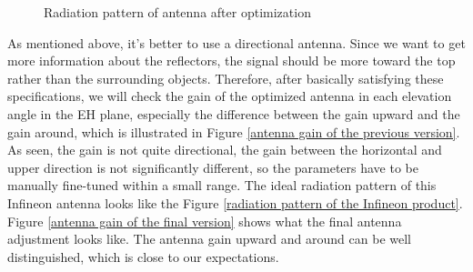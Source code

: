 \documentclass[12pt,DIV14,BCOR12mm,a4paper,footinclude=false,headinclude,parskip=half-,twoside,openright,cleardoublepage=empty,toc=index,bibliography=totoc,listof=totoc]{scrreprt}
\numberwithin{equation}{chapter}
\begin{document}
\begin{figure}[!htb]
\begin{subfigure}{0.45\textwidth}
    \end{subfigure}
    \caption{Radiation pattern of antenna after optimization}
    \label{radiation pattern of antenna after optimization}
\end{figure}

As mentioned above, it's better to use a directional antenna. Since we want to get more information about the reflectors, the signal should be more toward the top rather than the surrounding objects. Therefore, after basically satisfying these specifications, we will check the gain of the optimized antenna in each elevation angle in the EH plane, especially the difference between the gain upward and the gain around, which is illustrated in Figure \ref{antenna gain of the previous version}. As seen, the gain is not quite directional, the gain between the horizontal and upper direction is not significantly different, so the parameters have to be manually fine-tuned within a small range. The ideal radiation pattern of this Infineon antenna looks like the Figure \ref{radiation pattern of the Infineon product}. Figure \ref{antenna gain of the final version} shows what the final antenna adjustment looks like. The antenna gain upward and around can be well distinguished, which is close to our expectations.
\end{document}
